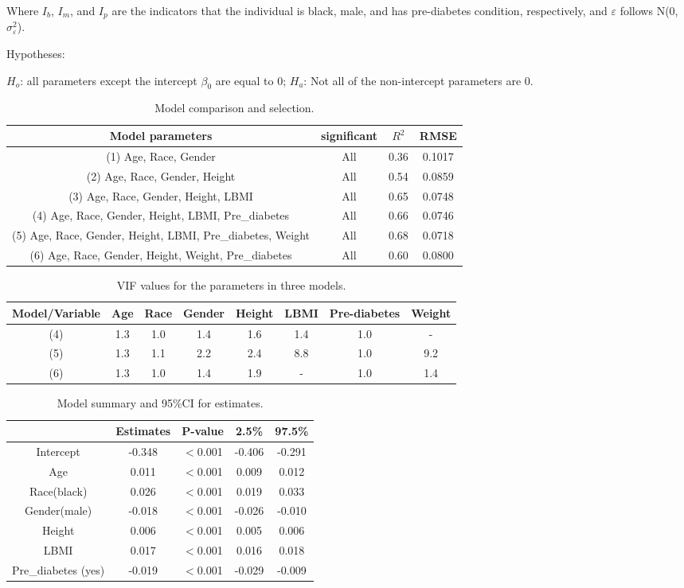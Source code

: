 \documentclass[11pt]{article}
\begin{document}
Where $I_b$, $I_m$, and $I_p$ are the indicators that the individual is black, male, and has pre-diabetes condition, respectively, and $\varepsilon$ follows N(0, $\sigma_\varepsilon^2$).

\bigskip
Hypotheses:
\medskip

$H_o$: all parameters except the intercept $\beta_0$ are equal to 0; 
$H_a$: Not all of the non-intercept parameters are 0.

\begin{table}[ht]
\centering
\caption{Model comparison and selection.\label{data3}}
\begin{tabular}{|c|c|c|c|}\hline
Model parameters& significant& $R^2$& RMSE\\\hline 
(1) Age, Race, Gender& All& 0.36& 0.1017\\\hline 
(2) Age, Race, Gender, Height& All& 0.54& 0.0859\\\hline 
(3) Age, Race, Gender, Height, LBMI& All& 0.65& 0.0748\\\hline 
(4) Age, Race, Gender, Height, LBMI, Pre\_diabetes& All& 0.66& 0.0746\\\hline 
(5) Age, Race, Gender, Height, LBMI, Pre\_diabetes, Weight& All& 0.68& 0.0718\\\hline 
(6) Age, Race, Gender, Height, Weight, Pre\_diabetes& All& 0.60& 0.0800\\\hline 
\end{tabular}
\end{table}	
 
\begin{table}[ht]
\centering
\caption{VIF values for the parameters in three models.\label{data3}}
\begin{tabular}{|c|c|c|c|c|c|c|c|}\hline
Model/Variable& Age& Race& Gender& Height& LBMI& Pre-diabetes& Weight\\\hline 
(4)& 1.3& 1.0& 1.4& 1.6& 1.4& 1.0& -\\\hline
(5)& 1.3& 1.1& 2.2& 2.4& 8.8& 1.0& 9.2\\\hline
(6)& 1.3& 1.0& 1.4& 1.9& -& 1.0& 1.4\\\hline
\end{tabular}
\end{table}	
			
\begin{table}[ht]
\centering
\caption{Model summary and 95\%CI for estimates.\label{data3}}
\begin{tabular}{|c|c|c|c|c|}\hline
&Estimates &P-value &2.5\% &97.5\%\\\hline 
Intercept& -0.348& $<$0.001& -0.406& -0.291\\\hline
Age& 0.011& $<$0.001& 0.009& 0.012\\\hline 
Race(black)& 0.026& $<$0.001& 0.019& 0.033\\\hline 
Gender(male)& -0.018& $<$0.001& -0.026& -0.010\\\hline 
Height& 0.006& $<$0.001& 0.005& 0.006\\\hline 
LBMI& 0.017& $<$0.001& 0.016& 0.018\\\hline 
Pre\_diabetes (yes)& -0.019& $<$0.001& -0.029& -0.009\\\hline 
\end{tabular}
\end{table}	
			
\end{document}
